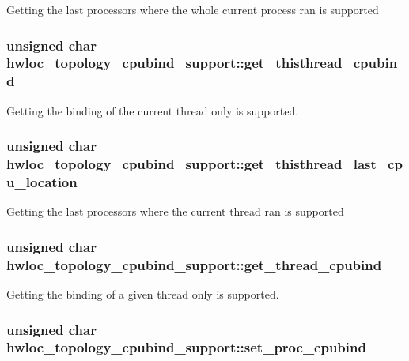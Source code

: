 \label{a00023_ad2d5c94b738d92b7d2ede87e4e96321d}
Getting the last processors where the whole current process ran is supported \hypertarget{a00023_a80d762e532d677dff262d83cc7bb1c60}{
\subsubsection[{get\_\-thisthread\_\-cpubind}]{\setlength{\rightskip}{0pt plus 5cm}unsigned char {\bf hwloc\_\-topology\_\-cpubind\_\-support::get\_\-thisthread\_\-cpubind}}}
\label{a00023_a80d762e532d677dff262d83cc7bb1c60}
Getting the binding of the current thread only is supported. \hypertarget{a00023_a6be1f042fdce6bf41b4ea39f6f193808}{
\subsubsection[{get\_\-thisthread\_\-last\_\-cpu\_\-location}]{\setlength{\rightskip}{0pt plus 5cm}unsigned char {\bf hwloc\_\-topology\_\-cpubind\_\-support::get\_\-thisthread\_\-last\_\-cpu\_\-location}}}
\label{a00023_a6be1f042fdce6bf41b4ea39f6f193808}
Getting the last processors where the current thread ran is supported \hypertarget{a00023_a8dd4d8531ed2eebdce1507e7d104154e}{
\subsubsection[{get\_\-thread\_\-cpubind}]{\setlength{\rightskip}{0pt plus 5cm}unsigned char {\bf hwloc\_\-topology\_\-cpubind\_\-support::get\_\-thread\_\-cpubind}}}
\label{a00023_a8dd4d8531ed2eebdce1507e7d104154e}
Getting the binding of a given thread only is supported. \hypertarget{a00023_aa166223d1c2a6de7256ab2d8b675a87e}{
\subsubsection[{set\_\-proc\_\-cpubind}]{\setlength{\rightskip}{0pt plus 5cm}unsigned char {\bf hwloc\_\-topology\_\-cpubind\_\-support::set\_\-proc\_\-cpubind}}}
